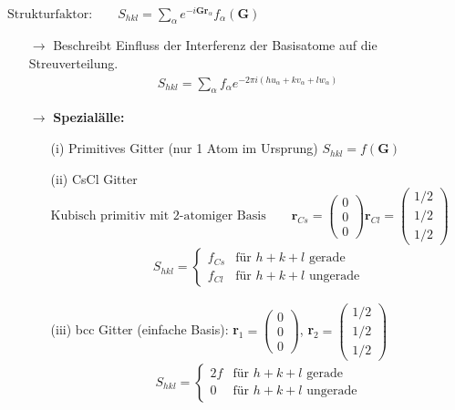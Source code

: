 \begin{itemize}
\begin{align*}
    \end{align*}
    $\text{Strukturfaktor:} \qquad S_{hkl} = \sum_{\alpha} e^{-i \textbf{G} \textbf{r}_{\alpha}} f_{\alpha} (\textbf{G})$
        \begin{itemize}
        \item[$\rightarrow$] Beschreibt Einfluss der Interferenz der Basisatome auf die Streuverteilung.
        \begin{align*}
            S_{hkl} = \sum_\alpha f_\alpha e^{-2\pi i (hu_\alpha+kv_\alpha+lw_\alpha)}
        \end{align*}
        \item[$\rightarrow$] \textbf{Spezialälle:}
        \begin{itemize}
            \item[(i)] Primitives Gitter (nur 1 Atom im Ursprung) $S_{hkl}=f(\textbf{G})$
            \item[(ii)] CsCl Gitter\\ $\text{Kubisch primitiv mit 2-atomiger Basis} \qquad \textbf{r}_{Cs}= \left(\begin{array}{c} 0 \\ 0 \\ 0 \end{array}\right) \textbf{r}_{Cl} = \left(\begin{array}{c} 1/2 \\ 1/2 \\ 1/2 \end{array}\right)$ 
            \begin{align*}
                S_{hkl} = \begin{cases}
                    f_{Cs} & \text{für $h+k+l$ gerade}\\
                    f_{Cl} & \text{für $h+k+l$ ungerade}
                \end{cases}
            \end{align*}

            \item[(iii)] bcc Gitter (einfache Basis): \textbf{r}$_1 = \left(\begin{array}{c} 0 \\ 0 \\ 0 \end{array}\right)$, \textbf{r}$_2 = \left(\begin{array}{c} 1/2 \\ 1/2 \\ 1/2 \end{array}\right)$
            \begin{align*}
                S_{hkl} = \begin{cases}
                    2f & \text{für $h+k+l$ gerade}\\
                    0 & \text{für $h+k+l$ ungerade}
                \end{cases}
            \end{align*}


\end{itemize}
\end{itemize}
\end{itemize}
